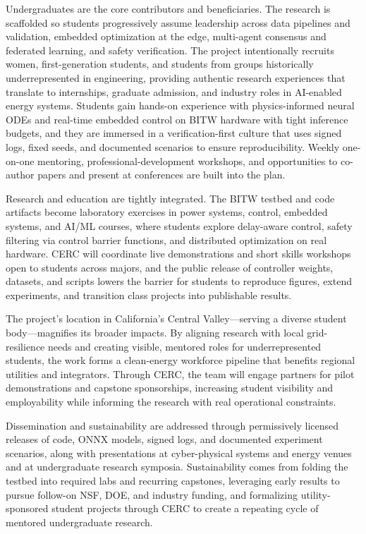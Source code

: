\documentclass[12pt]{article}
\begin{document}
Undergraduates are the core contributors and beneficiaries. The research is scaffolded so students progressively assume leadership across data pipelines and validation, embedded optimization at the edge, multi-agent consensus and federated learning, and safety verification. The project intentionally recruits women, first-generation students, and students from groups historically underrepresented in engineering, providing authentic research experiences that translate to internships, graduate admission, and industry roles in AI-enabled energy systems. Students gain hands-on experience with physics-informed neural ODEs and real-time embedded control on BITW hardware with tight inference budgets, and they are immersed in a verification-first culture that uses signed logs, fixed seeds, and documented scenarios to ensure reproducibility. Weekly one-on-one mentoring, professional-development workshops, and opportunities to co-author papers and present at conferences are built into the plan.

Research and education are tightly integrated. The BITW testbed and code artifacts become laboratory exercises in power systems, control, embedded systems, and AI/ML courses, where students explore delay-aware control, safety filtering via control barrier functions, and distributed optimization on real hardware. CERC will coordinate live demonstrations and short skills workshops open to students across majors, and the public release of controller weights, datasets, and scripts lowers the barrier for students to reproduce figures, extend experiments, and transition class projects into publishable results.

The project's location in California's Central Valley—serving a diverse student body—magnifies its broader impacts. By aligning research with local grid-resilience needs and creating visible, mentored roles for underrepresented students, the work forms a clean-energy workforce pipeline that benefits regional utilities and integrators. Through CERC, the team will engage partners for pilot demonstrations and capstone sponsorships, increasing student visibility and employability while informing the research with real operational constraints.

Dissemination and sustainability are addressed through permissively licensed releases of code, ONNX models, signed logs, and documented experiment scenarios, along with presentations at cyber-physical systems and energy venues and at undergraduate research symposia. Sustainability comes from folding the testbed into required labs and recurring capstones, leveraging early results to pursue follow-on NSF, DOE, and industry funding, and formalizing utility-sponsored student projects through CERC to create a repeating cycle of mentored undergraduate research.
\end{document}
